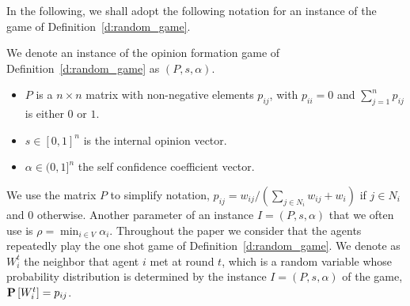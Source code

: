 In the following, we shall adopt the following notation for
an instance of the game of Definition~\ref{d:random_game}.
%
\begin{definition}\label{d:instance}
  We denote an instance of the opinion formation game of Definition~\ref{d:random_game}
  as $(P,s,\alpha)$.
  \begin{itemize}
    \item $P$ is a $n \times n$  matrix with non-negative elements $p_{ij}$,
      with $p_{ii}=0$ and $\sum_{j=1}^n p_{ij}$ is either $0$ or $1$.
    \item $s \in [0,1]^n$ is the internal opinion vector.
    \item $\alpha \in (0,1]^n$ the self confidence coefficient vector.
  \end{itemize}
\end{definition}
%
We use the matrix $P$ to simplify notation, $p_{ij} = w_{ij}/(\sum_{j \in N_i}w_{ij}+w_i)$
if $j \in N_i$ and $0$ otherwise.
Another parameter of an instance $I=(P,s,\alpha)$ that we often use is
$\rho=\min_{i \in V}\alpha_i$. Throughout the paper we consider that the agents repeatedly 
play the one shot game of Definition~\ref{d:random_game}.
We denote as $W_i^t$ the neighbor that agent $i$ met
at round $t$, which is a random variable whose 
probability distribution is determined by the 
instance $I=(P,s,\alpha)$ of the game, $\bm{\mathrm{P}}\left[W_i^t\right]=p_{ij}$.


